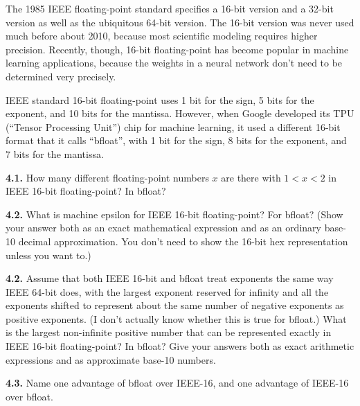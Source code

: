 \documentclass[11pt]{article}
\begin{document}
The 1985 IEEE floating-point standard specifies a 16-bit version 
and a 32-bit version as well as the ubiquitous 64-bit version.
The 16-bit version was never used much before about 2010,
because most scientific modeling requires higher precision. 
Recently, though, 
16-bit floating-point has become popular in machine learning applications,
because the weights in a neural network don't need to be determined very precisely.

IEEE standard 16-bit floating-point uses 1 bit for the sign, 5 bits for 
the exponent, and 10 bits for the mantissa. 
However, when Google developed its TPU (``Tensor Processing Unit'') chip
for machine learning, it used a different 16-bit format that it calls
``bfloat'', with 1 bit for the sign, 8 bits for the exponent, and 7 bits for the mantissa.

\par\medskip
{\bf 4.1.}
How many different floating-point numbers $x$ are there with $1 < x < 2$
in IEEE 16-bit floating-point? In bfloat?

\par\medskip
{\bf 4.2.}
What is machine epsilon for IEEE 16-bit floating-point? For bfloat?
(Show your answer both as an exact mathematical expression and as an ordinary base-10
decimal approximation. 
You don't need to show the 16-bit hex representation unless you want to.)

\par\medskip
{\bf 4.2.}
Assume that both IEEE 16-bit and bfloat treat exponents the same way IEEE 64-bit
does, with the largest exponent reserved for infinity and all the exponents
shifted to represent about the same number of negative exponents as positive
exponents. (I don't actually know whether this is true for bfloat.)
What is the largest non-infinite positive number that can be represented exactly
in IEEE 16-bit floating-point? In bfloat? Give your answers both as exact
arithmetic expressions and as approximate base-10 numbers.

\par\medskip
{\bf 4.3.}
Name one advantage of bfloat over IEEE-16, 
and one advantage of IEEE-16 over bfloat.
\end{document}
